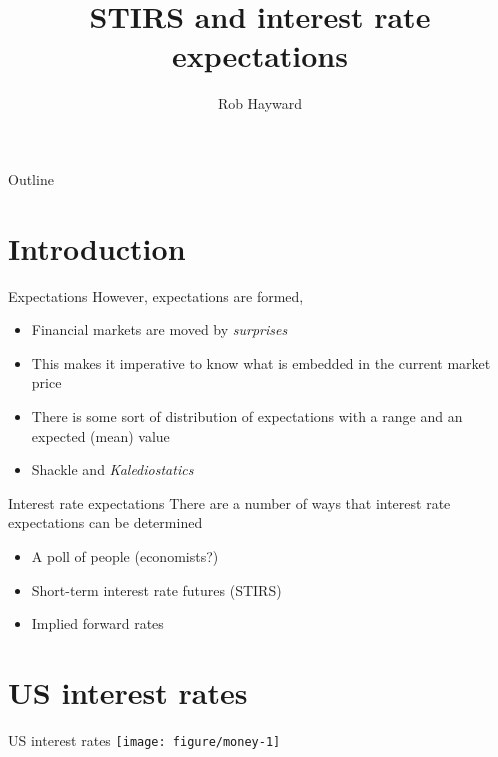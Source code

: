 \documentclass[14pt,xcolor=pdftex,dvipsnames,table]{beamer}\usepackage[]{graphicx}\usepackage[]{color}
\title{STIRS and interest rate expectations}
\author{Rob Hayward}
\makeatletter
\def\maxwidth{ %
  \ifdim\Gin@nat@width>\linewidth
    \linewidth
  \else
    \Gin@nat@width
  \fi
}
\newenvironment{knitrout}{}{} %
\makeatother
\begin{document}
\begin{frame}
\titlepage
\end{frame}

\begin{frame}{Outline}
\tableofcontents
\end{frame}

\section{Introduction}
\begin{frame}{Expectations}
However, expectations are formed, 
\begin{itemize}[<+-| alert@+>]
\pause
\item Financial markets are moved by \emph{surprises}
\item This makes it imperative to know what is embedded in the current market price
\item There is some sort of distribution of expectations with a range and an expected (mean) value
\item Shackle and \emph{Kalediostatics} 
\end{itemize}
\end{frame}

\begin{frame}{Interest rate expectations}
There are a number of ways that interest rate expectations can be determined 
\begin{itemize}[<+-| alert@+>]
\pause
\item A poll of people (economists?)
\item Short-term interest rate futures (STIRS)
\item Implied forward rates
\end{itemize}
\end{frame}

\section{US interest rates}

\begin{frame}{US interest rates}
\begin{knitrout}
\color{fgcolor}
\texttt{[image: figure/money-1]} 

\end{knitrout}
\end{frame}
\end{document}
